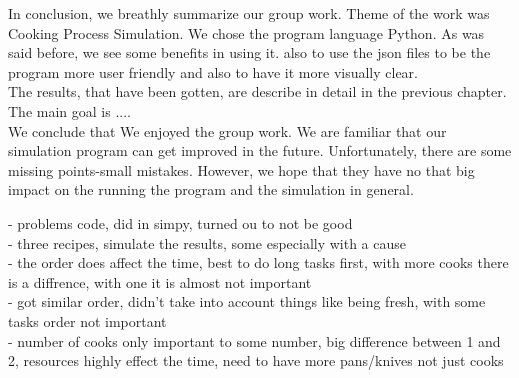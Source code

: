 In conclusion, we breathly summarize our group work. Theme of the work was Cooking Process Simulation. We chose the program language Python. As was said before, we see some benefits in using it. also to use the json files to be the program more user friendly and also to have it more visually clear. \\

The results, that have been gotten, are describe in detail in the previous chapter. The main goal is ....\\

We conclude that We enjoyed the group work. We are familiar that our simulation program can get improved in the future. Unfortunately, there are some missing points-small mistakes. However, we hope that they have no that big impact on the running the program and the simulation in general.  


- problems code, did in simpy, turned ou to not be good \\
- three recipes, simulate the results, some especially with a cause \\
- the order does affect the time, best to do long tasks first, with more cooks there is a diffrence, with one it is almost not important \\
- got similar order, didn't take into account things like being fresh, with some tasks order not important \\
- number of cooks only important to some number, big difference between 1 and 2, resources highly effect the time, need to have more pans/knives not just cooks \\





